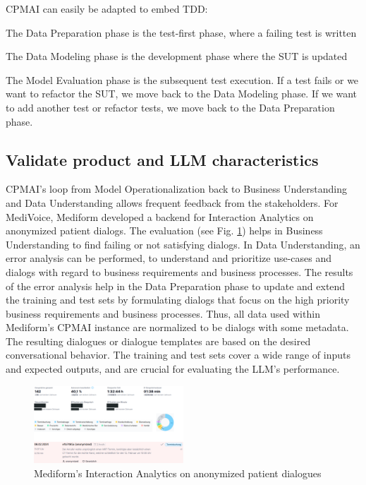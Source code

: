 \documentclass[twocolumn]{article}
\begin{document}
CPMAI can easily be adapted to embed TDD:
\begin{compactitem}
\item The Data Preparation phase is the test-first phase, where a failing test is written
\item The Data Modeling phase is the development phase where the SUT is updated
\item The Model Evaluation phase is the subsequent test execution. If a test fails or we want to refactor the SUT, we move back to the Data Modeling phase. If we want to add another test or refactor tests, we move back to the Data Preparation phase.
\end{compactitem}

\subsection{Validate product and LLM characteristics}

CPMAI’s loop from Model Operationalization back to Business Understanding and Data Understanding allows frequent feedback from the stakeholders. For MediVoice, Mediform developed a backend for Interaction Analytics on anonymized patient dialogs. The evaluation (see Fig. \ref{fig:interactionanalytics}) helps in Business Understanding to find failing or not satisfying dialogs. In Data Understanding, an error analysis can be performed, to understand and prioritize use-cases and dialogs with regard to business requirements and business processes. The results of the error analysis help in the Data Preparation phase to update and extend the training and test sets by formulating dialogs that focus on the high priority business requirements and business processes. Thus, all data used within Mediform’s CPMAI instance are normalized to be dialogs with some metadata. The resulting dialogues or dialogue templates are based on the desired conversational behavior. The training and test sets cover a wide range of inputs and expected outputs, and are crucial for evaluating the LLM’s performance.

\begin{figure}[hbt!]
  \begin{center}
\includegraphics[width=0.5\textwidth]{figures/InteractionAnalytics}
  \vspace{-8mm}
\caption{Mediform’s Interaction Analytics on anonymized patient dialogues}
\label{fig:interactionanalytics}
\end{center}
\end{figure}
\end{document}
